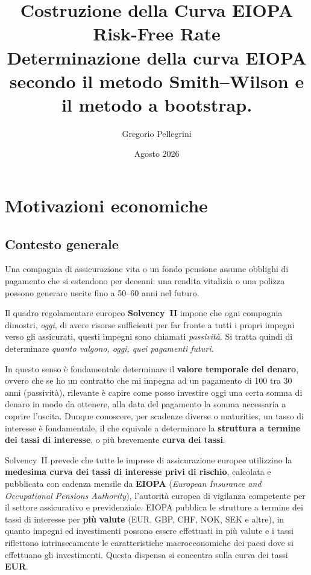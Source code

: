 \documentclass[11pt,a4paper]{article}
\title{%
  \textbf{Costruzione della Curva EIOPA Risk-Free Rate}\\[6pt]
  \large Determinazione della curva EIOPA secondo il metodo Smith--Wilson e il metodo a bootstrap.\\[4pt]
}
\author{Gregorio Pellegrini}
\date{Agosto 2026}
\theoremstyle{plain}
\theoremstyle{definition}
\theoremstyle{remark}
\begin{document}
\maketitle
\tableofcontents
\newpage

\section{Motivazioni economiche}

\subsection{Contesto generale}

Una compagnia di assicurazione vita o un fondo pensione assume obblighi di pagamento che si
estendono per decenni: una rendita vitalizia o una polizza possono generare uscite fino a
50--60 anni nel futuro.

Il quadro regolamentare europeo \textbf{Solvency~II} impone che ogni compagnia dimostri,
\emph{oggi}, di avere risorse sufficienti per far fronte a tutti i propri impegni verso gli
assicurati, questi impegni sono chiamati \emph{passivit\`a}. Si tratta quindi di determinare \emph{quanto
valgono, oggi, quei pagamenti futuri.}

In questo senso è fondamentale determinare il \textbf{valore temporale del denaro}, ovvero che se ho un contratto
che mi impegna ad un pagamento di 100 tra 30 anni (passività), rilevante è capire come posso investire 
oggi una certa somma di denaro in modo da ottenere, alla data del pagamento la somma necessaria a coprire l'uscita.
Dunque conoscere, per scadenze diverse o maturities, un tasso di interesse è fondamentale, il che equivale a
determinare la \textbf{struttura a
termine dei tassi di interesse}, o pi\`u brevemente \textbf{curva dei tassi}.

Solvency~II prevede che tutte le imprese di assicurazione europee utilizzino la \textbf{medesima
curva dei tassi di interesse privi di rischio}, calcolata e pubblicata con cadenza mensile da
\textbf{EIOPA} (\emph{European Insurance and Occupational Pensions Authority}), l'autorit\`a
europea di vigilanza competente per il settore assicurativo e previdenziale. EIOPA pubblica le
strutture a termine dei tassi di interesse per \textbf{pi\`u valute} (EUR, GBP, CHF, NOK, SEK e
altre), in quanto impegni ed investimenti possono essere effettuati in più valute e 
i tassi riflettono intrinsecamente le caratteristiche macroeconomiche dei paesi dove si effettuano gli investimenti.
 Questa dispensa si concentra sulla curva dei tassi \textbf{EUR}.%
\end{document}
